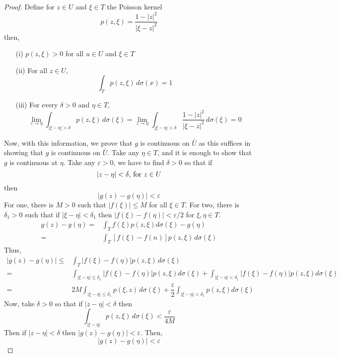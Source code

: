 \begin{proof}
Define for $z\in U$ and $\xi \in T$ the Poisson kernel 
\[p(z,\xi )=\dfrac{1-|z|^2}{|\xi -z|^2}\]
then,
\begin{itemize}
\item[(i)] $p(z,\xi )>0$ for all $u\in U$ and $\xi \in T$
\item[(ii)] For all $z\in U$, \[\int _{T}p(z,\xi )\,d\sigma (x)=1\]
\item[(iii)] For every $\delta >0$ and $\eta \in T$,
\[\lim _{z\rightarrow \eta }\int _{|\xi -\eta |>\delta }p(z,\xi )\,d\sigma (\xi )=\lim _{z\rightarrow \eta }\int _{|\xi -\eta |>\delta }\dfrac{1-|z|^2}{|\xi -z|^2}\,d\sigma (\xi )=0\]
\end{itemize}
Now, with this information, we prove that $g$ is continuous on $\bar{U}$ as this suffices in showing that $g$ is continuous on $\bar{U}$. Take any $\eta \in T$, and it is enough to show that $g$ is continuous at $\eta $. Take any $\varepsilon>0$, we have to find $\delta >0$ so that if 
\[|z-\eta |<\delta $, for $z\in U\] then 
\[|g(z)-g(\eta )|<\varepsilon \]
For one, there is $M>0$ such that $|f(\xi )|\leq M$ for all $\xi \in T$. For two, there is $\delta_1>0$ such that if $|\xi -\eta |<\delta_1$ then $|f(\xi )-f(\eta )|<\varepsilon /2$ for $\xi ,\eta \in T$. 
\begin{align*}
g(z)-g(\eta )=&\int _{T}f(\xi )p(z,\xi )d\sigma (\xi )-g(\eta )\\
=&\int _{T}[f(\xi )-f(n)]p(z,\xi )\,d\sigma (\xi )
\end{align*}
Thus, 
\begin{align*}
|g(z)-g(\eta )|\leq &\int _{T}|f(\xi )-f(\eta )|p(z,\xi )\,d\sigma (\xi )\\
=&\int _{|\xi -\eta |\leq \delta_1}|f(\xi )-f(\eta )|p(z,\xi )d\sigma (\xi )+\int _{|\xi -\eta |<\delta_1}|f(\xi )-f(\eta )|p(z,\xi )d\sigma (\xi )\\
=&2M\int _{|\xi -\eta |\leq \delta_1}p(\xi ,z)\,d\sigma (\xi )+\dfrac{\varepsilon }{2}\int _{|\xi -\eta |<\delta_1}p(z,\xi )d\sigma (\xi )
\end{align*}
Now, take $\delta >0$ so that if $|z-\eta |<\delta $ then
\[\int _{|\xi -\eta |}p(z,\xi )\,d\sigma (\xi )<\dfrac{\varepsilon }{4M}\]
Then if $|z-\eta |<\delta $ then $|g(z)-g(\eta )|<\varepsilon $. Then,
\[|g(z)-g(\eta )|<\varepsilon \]
\end{proof}
\vspace{2ex}

